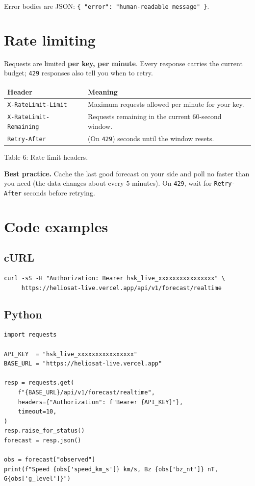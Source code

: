 \documentclass[11pt,a4paper]{article}
\newcommand{\tc}[1]{\texttt{#1}}
\begin{document}
Error bodies are JSON: \tc{\{ "error": "human-readable message" \}}.

\section{Rate limiting}

Requests are limited \textbf{per key, per minute}. Every response carries the current
budget; \tc{429} responses also tell you when to retry.

\begin{tabularx}{\textwidth}{@{}l X@{}}
\toprule
\rowcolor{tablehead}\textbf{Header} & \textbf{Meaning}\\
\midrule
\tc{X-RateLimit-Limit} & Maximum requests allowed per minute for your key.\\
\tc{X-RateLimit-Remaining} & Requests remaining in the current 60-second window.\\
\tc{Retry-After} & (On \tc{429}) seconds until the window resets.\\
\bottomrule
\end{tabularx}
\begin{center}\small Table 6: Rate-limit headers.\end{center}

\noindent\textbf{Best practice.} Cache the last good forecast on your side and poll no
faster than you need (the data changes about every 5 minutes). On \tc{429}, wait for
\tc{Retry-After} seconds before retrying.

\section{Code examples}

\subsection{cURL}
\begin{lstlisting}[style=bash]
curl -sS -H "Authorization: Bearer hsk_live_xxxxxxxxxxxxxxxx" \
     https://heliosat-live.vercel.app/api/v1/forecast/realtime
\end{lstlisting}

\subsection{Python}
\begin{lstlisting}[style=python]
import requests

API_KEY  = "hsk_live_xxxxxxxxxxxxxxxx"
BASE_URL = "https://heliosat-live.vercel.app"

resp = requests.get(
    f"{BASE_URL}/api/v1/forecast/realtime",
    headers={"Authorization": f"Bearer {API_KEY}"},
    timeout=10,
)
resp.raise_for_status()
forecast = resp.json()

obs = forecast["observed"]
print(f"Speed {obs['speed_km_s']} km/s, Bz {obs['bz_nt']} nT, G{obs['g_level']}")
\end{lstlisting}
\end{document}
